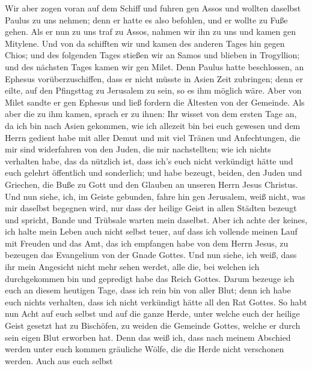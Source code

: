  Wir aber zogen voran auf dem Schiff und fuhren gen Assos
und wollten daselbst Paulus zu uns nehmen; denn er hatte es also
befohlen, und er wollte zu Fuße gehen.  Als er nun zu uns
traf zu Assos, nahmen wir ihn zu uns und kamen gen Mitylene.
 Und von da schifften wir und kamen des anderen Tages hin
gegen Chios; und des folgenden Tages stießen wir an Samos und blieben in
Trogyllion; und des nächsten Tages kamen wir gen Milet. 
Denn Paulus hatte beschlossen, an Ephesus vorüberzuschiffen, dass er
nicht müsste in Asien Zeit zubringen; denn er eilte, auf den Pfingsttag
zu Jerusalem zu sein, so es ihm möglich wäre.  Aber von
Milet sandte er gen Ephesus und ließ fordern die Ältesten von der
Gemeinde.  Als aber die zu ihm kamen, sprach er zu ihnen:
Ihr wisset von dem ersten Tage an, da ich bin nach Asien gekommen, wie
ich allezeit bin bei euch gewesen  und dem Herrn gedient
habe mit aller Demut und mit viel Tränen und Anfechtungen, die mir sind
widerfahren von den Juden, die mir nachstellten;  wie ich
nichts verhalten habe, das da nützlich ist, dass ich's euch nicht
verkündigt hätte und euch gelehrt öffentlich und sonderlich;
 und habe bezeugt, beiden, den Juden und Griechen, die
Buße zu Gott und den Glauben an unseren Herrn Jesus Christus.
 Und nun siehe, ich, im Geiste gebunden, fahre hin gen
Jerusalem, weiß nicht, was mir daselbst begegnen wird, 
nur dass der heilige Geist in allen Städten bezeugt und spricht, Bande
und Trübsale warten mein daselbst.  Aber ich achte der
keines, ich halte mein Leben auch nicht selbst teuer, auf dass ich
vollende meinen Lauf mit Freuden und das Amt, das ich empfangen habe von
dem Herrn Jesus, zu bezeugen das Evangelium von der Gnade Gottes.
 Und nun siehe, ich weiß, dass ihr mein Angesicht nicht
mehr sehen werdet, alle die, bei welchen ich durchgekommen bin und
gepredigt habe das Reich Gottes.  Darum bezeuge ich euch
an diesem heutigen Tage, dass ich rein bin von aller Blut;
 denn ich habe euch nichts verhalten, dass ich nicht
verkündigt hätte all den Rat Gottes.  So habt nun Acht
auf euch selbst und auf die ganze Herde, unter welche euch der heilige
Geist gesetzt hat zu Bischöfen, zu weiden die Gemeinde Gottes, welche er
durch sein eigen Blut erworben hat.  Denn das weiß ich,
dass nach meinem Abschied werden unter euch kommen gräuliche Wölfe, die
die Herde nicht verschonen werden.  Auch aus euch selbst
